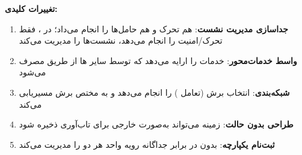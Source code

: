 \textbf{تغییرات کلیدی:}

\begin{enumerate}
\def\labelenumi{\arabic{enumi}.}
\tightlist
\item
  \textbf{جداسازی مدیریت نشست}:  هم تحرک و هم حامل‌ها را انجام می‌داد؛ در ،  فقط تحرک/\allowbreak{}امنیت را انجام می‌دهد،  نشست‌ها را مدیریت می‌کند
\item
  \textbf{واسط خدمات‌محور}:  خدمات  را ارایه می‌دهد که توسط سایر ها از طریق  مصرف می‌شود
\item
  \textbf{شبکه‌بندی}:  انتخاب برش (تعامل ) را انجام می‌دهد و به  مختص برش مسیریابی می‌کند
\item
  \textbf{طراحی بدون حالت}: زمینه  می‌تواند به‌صورت خارجی  برای تاب‌آوری ذخیره شود
\item
  \textbf{ثبت‌نام یکپارچه}: بدون  در برابر  جداگانه  رویه  واحد هر دو را مدیریت می‌کند
\end{enumerate}
